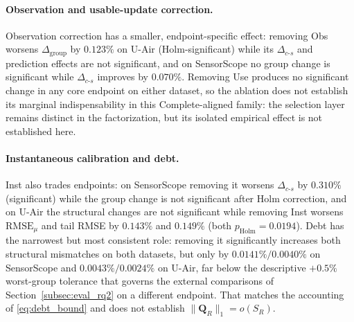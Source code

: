 \documentclass[letterpaper,journal]{IEEEtran}
\begin{document}
\paragraph{Observation and usable-update correction.}
Observation correction has a smaller, endpoint-specific effect: removing Obs
worsens $\Delta_{\mathrm{group}}$ by $0.123\%$ on U-Air (Holm-significant) while
its $\Delta_{c\text{-}s}$ and prediction effects are not significant, and on
SensorScope no group change is significant while $\Delta_{c\text{-}s}$ improves
by $0.070\%$.  Removing Use produces no significant change in any core endpoint
on either dataset, so the ablation does not establish its marginal
indispensability in this Complete-aligned family: the selection layer remains
distinct in the factorization, but its isolated empirical effect is not
established here.
\paragraph{Instantaneous calibration and debt.}
Inst also trades endpoints: on SensorScope removing it worsens
$\Delta_{c\text{-}s}$ by $0.310\%$ (significant) while the group change is not
significant after Holm correction, and on U-Air the structural changes are not
significant while removing Inst worsens $\mathrm{RMSE}_{\mu}$ and tail RMSE by
$0.143\%$ and $0.149\%$ (both $p_{\mathrm{Holm}}=0.0194$).  Debt has the
narrowest but most consistent role: removing it significantly increases both
structural mismatches on both datasets, but only by $0.0141\%/0.0040\%$ on
SensorScope and $0.0043\%/0.0024\%$ on U-Air, far below the descriptive
$+0.5\%$ worst-group tolerance that governs the external comparisons of
Section~\ref{subsec:eval_rq2} on a different endpoint.  That matches the
accounting of \eqref{eq:debt_bound} and does not establish
$\|\mathbf Q_R\|_1=o(S_R)$.
\end{document}

